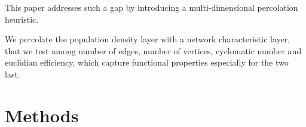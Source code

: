\documentclass{jimis-en}
\begin{document}
This paper addresses such a gap by introducing a multi-dimensional percolation heuristic.












We percolate the population density layer with a network characteristic layer, that we test among number of edges, number of vertices, cyclomatic number and euclidian efficiency, which capture functional properties especially for the two last.



\section{Methods}
\end{document}
